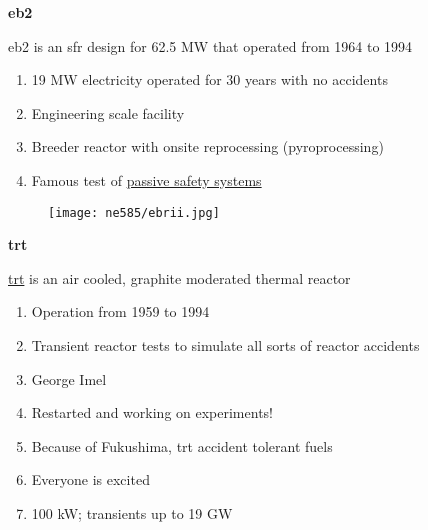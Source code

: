 \documentclass[aspectratio=1610,pdftex,dvipsnames,compress,xcolor={dvipsnames}]{beamer}
\newcommand{\acf}{\acrfull} %
\newcommand{\acs}{\acrshort} %
\begin{document}
\begin{frame}[plain]{}
    \centering\LARGE\textbf{\acs{eb2}}
\end{frame}


\addtocounter{framenumber}{-1} 
\begin{frame}{\acs{eb2} is an \acf{sfr} design for 62.5 MW that operated from 1964 to 1994}
    \begin{enumerate}[series=outerlist,topsep=0pt,itemsep=21pt,leftmargin=*,label=(\arabic*)]
        \item[]19 MW electricity operated for 30 years with no accidents
        \item[]Engineering scale facility
        \item[]Breeder reactor with onsite reprocessing (pyroprocessing)
        \item[]Famous test of \href{https://youtu.be/Sp1Xja6HlIU}{passive safety systems}
    \end{enumerate}
\end{frame}


\begin{frame}{}
    \begin{figure}
        \centering
        \texttt{[image: ne585/ebrii.jpg]}
    \end{figure}
\end{frame}


\begin{frame}[plain]{}
    \centering\LARGE\textbf{\acs{trt}}
\end{frame}


\addtocounter{framenumber}{-1} 
\begin{frame}{\href{https://uidaho.pressbooks.pub/nuclearengineering/chapter/front-end-of-the-fuel-cycle/}{\acs{trt}} is an air cooled, graphite moderated thermal reactor}
    \begin{enumerate}[series=outerlist,topsep=0pt,itemsep=21pt,leftmargin=*,label=(\arabic*)]
        \item[]Operation from 1959 to 1994
        \item[]Transient reactor tests to simulate all sorts of reactor accidents
        \item[]George Imel
        \item[]Restarted and working on experiments!
        \item[]Because of Fukushima, \acs{trt} accident tolerant fuels
        \item[]Everyone is excited
        \item[]100 kW; transients up to 19 GW
    \end{enumerate}
\end{frame}
\end{document}
